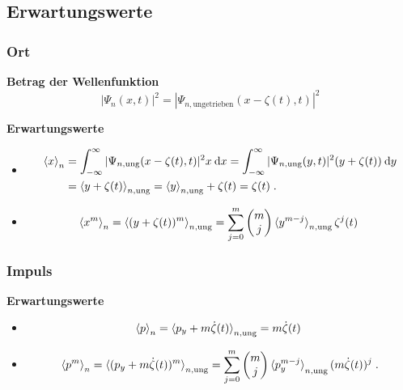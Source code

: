 \subsection{Erwartungswerte}
\begin{frame}
  \frametitle{Ort}
  \textbf{Betrag der Wellenfunktion}
  \begin{equation}
    |\Psi_n(x,t)|^2=|\Psi_{n,\text{ungetrieben}}(x-\zeta(t),t)|^2
  \end{equation}

  \textbf{Erwartungswerte}
  \begin{itemize}
    \item
  \begin{align}
    \begin{split}
      \braket{x}_n &= \int_{-\infty}^{\infty} |\Psi_{n,\text{ung}}(x-\zeta(t),t)|^2 x \: \text dx
      = \int_{-\infty}^{\infty} |\Psi_{n,\text{ung}}(y,t)|^2 (y+\zeta(t)) \: \text dy \\
      &= \braket{y+ \zeta(t)}_{n,\text{ung}} = \braket{y}_{n,\text{ung}} + \zeta(t) = \zeta(t) \; .
      \label{erwartungswert_x_einzelner}
    \end{split}
  \end{align}

    \item
  \begin{equation}
    \braket{x^m}_n = \braket{(y+\zeta(t))^m}_{n,\text{ung}} = \sum_{j=0}^m \begin{pmatrix} m \\ j \\ \end{pmatrix} \braket{y^{m-j}}_{n,\text{ung}}\zeta^j(t) \;
    \label{erwartungswert_x^m_einzelner}
  \end{equation}
  \end{itemize}

\end{frame}




\begin{frame}
  \frametitle{Impuls}
  \textbf{Erwartungswerte}
  \begin{itemize}
    \item
    \begin{align}
      \braket{p}_n = \braket{p_y+ m\dot\zeta(t)}_{n,\text{ung}} = m\dot{\zeta}(t) \;
      \label{erwartungswert_p_einzelner}
    \end{align}

    \item
    \begin{equation}
        \braket{p^m}_n = \braket{(p_y+m\dot\zeta(t))^m}_{n,\text{ung}} = \sum_{j=0}^m\begin{pmatrix} m \\ j \\ \end{pmatrix} \braket{p_y^{m-j}}_{n,\text{ung}}(m\dot\zeta(t))^j \; .
        \label{erwartungswert_p^m_einzelner}
    \end{equation}
  \end{itemize}
\end{frame}


